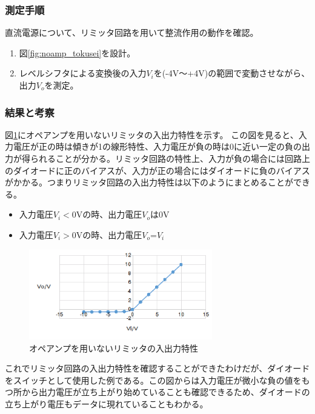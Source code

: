 \documentclass[11pt,a4j]{jsarticle}
\begin{document}
    
   \subsubsection{測定手順}
    直流電源について、リミッタ回路を用いて整流作用の動作を確認。
    \begin{enumerate}
    \item 図\ref{fig:noamp_tokusei}を設計。
    \item レベルシフタによる変換後の入力$V_i$を(-4V～+4V)の範囲で変動させながら、出力$V_o$を測定。
    \end{enumerate}
    
   \subsubsection{結果と考察}
    図\ref{fig:1_1_noamp_PS}にオペアンプを用いないリミッタの入出力特性を示す。
    この図を見ると、入力電圧が正の時は傾きが1の線形特性、入力電圧が負の時は0に近い一定の負の出力が得られることが分かる。リミッタ回路の特性上、入力が負の場合には回路上のダイオードに正のバイアスが、入力が正の場合にはダイオードに負のバイアスがかかる。つまりリミッタ回路の入出力特性は以下のようにまとめることができる。
    \begin{itemize}
    \item 入力電圧$V_i < 0$Vの時、出力電圧$V_o$は0V
    \item 入力電圧$V_i > 0$Vの時、出力電圧$V_o$=$V_i$
    \end{itemize}
    
    
    \begin{figure}[htbp]
  \centering
  \includegraphics[width=8cm,clip]{1_1_noamp_PS.png}
  \caption{オペアンプを用いないリミッタの入出力特性}
  \label{fig:1_1_noamp_PS}
 \end{figure}%
    
    これでリミッタ回路の入出力特性を確認することができたわけだが、ダイオードをスイッチとして使用した例である。この図からは入力電圧が微小な負の値をもつ所から出力電圧が立ち上がり始めていることも確認できるため、ダイオードの立ち上がり電圧もデータに現れていることもわかる。
    
\end{document}
